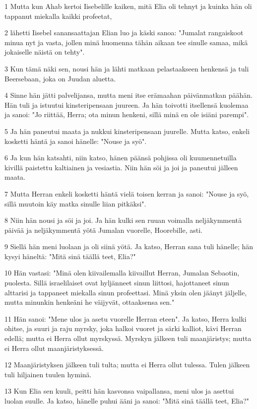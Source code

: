 \par 1 Mutta kun Ahab kertoi Iisebelille kaiken, mitä Elia oli tehnyt ja kuinka hän oli tappanut miekalla kaikki profeetat,
\par 2 lähetti Iisebel sanansaattajan Elian luo ja käski sanoa: "Jumalat rangaiskoot minua nyt ja vasta, jollen minä huomenna tähän aikaan tee sinulle samaa, mikä jokaiselle näistä on tehty".
\par 3 Kun tämä näki sen, nousi hän ja lähti matkaan pelastaakseen henkensä ja tuli Beersebaan, joka on Juudan aluetta.
\par 4 Sinne hän jätti palvelijansa, mutta meni itse erämaahan päivänmatkan päähän. Hän tuli ja istuutui kinsteripensaan juureen. Ja hän toivotti itsellensä kuolemaa ja sanoi: "Jo riittää, Herra; ota minun henkeni, sillä minä en ole isiäni parempi".
\par 5 Ja hän paneutui maata ja nukkui kinsteripensaan juurelle. Mutta katso, enkeli kosketti häntä ja sanoi hänelle: "Nouse ja syö".
\par 6 Ja kun hän katsahti, niin katso, hänen päänsä pohjissa oli kuumennetuilla kivillä paistettu kaltiainen ja vesiastia. Niin hän söi ja joi ja paneutui jälleen maata.
\par 7 Mutta Herran enkeli kosketti häntä vielä toisen kerran ja sanoi: "Nouse ja syö, sillä muutoin käy matka sinulle liian pitkäksi".
\par 8 Niin hän nousi ja söi ja joi. Ja hän kulki sen ruuan voimalla neljäkymmentä päivää ja neljäkymmentä yötä Jumalan vuorelle, Hoorebille, asti.
\par 9 Siellä hän meni luolaan ja oli siinä yötä. Ja katso, Herran sana tuli hänelle; hän kysyi häneltä: "Mitä sinä täällä teet, Elia?"
\par 10 Hän vastasi: "Minä olen kiivailemalla kiivaillut Herran, Jumalan Sebaotin, puolesta. Sillä israelilaiset ovat hyljänneet sinun liittosi, hajottaneet sinun alttarisi ja tappaneet miekalla sinun profeettasi. Minä yksin olen jäänyt jäljelle, mutta minunkin henkeäni he väijyvät, ottaaksensa sen."
\par 11 Hän sanoi: "Mene ulos ja asetu vuorelle Herran eteen". Ja katso, Herra kulki ohitse, ja suuri ja raju myrsky, joka halkoi vuoret ja särki kalliot, kävi Herran edellä; mutta ei Herra ollut myrskyssä. Myrskyn jälkeen tuli maanjäristys; mutta ei Herra ollut maanjäristyksessä.
\par 12 Maanjäristyksen jälkeen tuli tulta; mutta ei Herra ollut tulessa. Tulen jälkeen tuli hiljainen tuulen hyminä.
\par 13 Kun Elia sen kuuli, peitti hän kasvonsa vaipallansa, meni ulos ja asettui luolan suulle. Ja katso, hänelle puhui ääni ja sanoi: "Mitä sinä täällä teet, Elia?"
